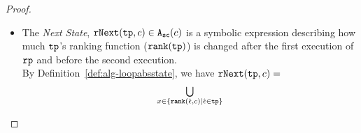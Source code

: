 \begin{proof}
\begin{itemize}
 \[
  \bigcup_{x \in \left\{ \rank(\absevent, c) | \tpath \in \rprog \land \absevent \in \tpath \right\} }
  \left \{ 
  x = \max_{l_1}\left\{
    \varinvar(y, c) + v ~\middle\vert~ 
    \begin{array}{l} 
      (l_1, x' \leq y + v, l_2) \in \reset(x, c) 
      \\
    \land l_1 \leq \absinit(\rprog, c).
  \end{array}
  \right\}
  \right\}
 \]
 Taking an arbitrary ranking function $x \in \left\{ \rank(\absevent, c) | \absevent \in \tpath \right\}$,
 let $\trace' \in \ftdom$ be the execution trace before first execution of $l_f: \rprog_t$, we have
\[
 \config{c_l, \trace_r} \to^* \config{c_t;c_r', \trace_r \tracecat \trace'} \to^* \config{\clabel{\eskip}^{l}, \trace_r \tracecat \trace}
\]
 By the soundness of the rank estimation in Lemma~\ref{lem:local_bound_sound} and Theorem~\ref{thm:pathinsensitive_rb_soundness}, we know 
 for each variable $y$ such that $(l_1, x' \leq y + v, l_2) \in \reset(x, c) $,
 $\varinvar(y, c)$ is the sound upper bound on its maximum value during the execution. Then we have
 \[
   \econfig{\varinvar(y, c)}(\trace_0) \geq \max \left\{ v ~|~  \env(\trace) y = v \right\}  \geq \env(\trace') y 
 \]
%
 In this sense, we have 
 $
 \max\limits_{l_1}\left\{
  \varinvar(y, c) + v ~\middle\vert~ 
  \begin{array}{l} 
    (l_1, x' \leq y + v, l_2) \in \reset(x, c) \\
    \land l_1 \leq \absinit(\rprog)
\end{array}
\right\}
 $
 is a sound initial value estimation of the value of $x$ before first execution of $\rprog$, i.e.,
 \[
   \econfig{\max_{l_1}\left\{
    \varinvar(y, c) + v ~\middle\vert~ 
    \begin{array}{l} 
      (l_1, x' \leq y + v, l_2) \in \reset(x, c) \\
      \land l_1 \leq \absinit(\rprog)
  \end{array}
  \right\}}(\trace_0) 
   \geq \env(\trace') x.
   \]
 \item  
 The \emph{Next State}, $\mathtt{rNext}(\mathtt{tp}, c) \in {\ensuremath{\mathtt{A_{sc}}}}(c)$ 
 is a
 symbolic expression describing how much $\mathtt{tp}$'s ranking function ($\mathtt{rank}(\mathtt{tp})$) is changed after the first execution of $\rprog$ and before the second execution.
\\
 By Definition~\ref{def:alg-loopabsstate}, we have $ \mathtt{rNext}(\mathtt{tp}, c) = $
 \[
   \begin{array}{l}
   \bigcup\limits_{x \in \left\{ \rank(\absevent, c) | \absevent \in \tpath \right\}}

\end{array}\]
\end{itemize}
\end{proof}
